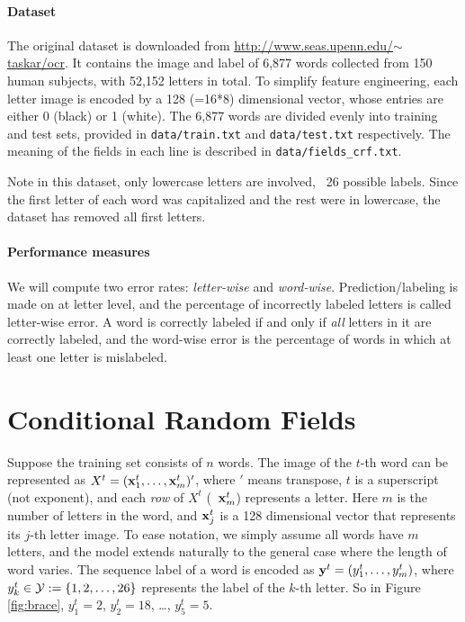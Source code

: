 \documentclass[11pt]{report}
\begin{document}
\paragraph{Dataset}
The original dataset is downloaded from \href{http://www.seas.upenn.edu/~taskar/ocr/}{http://www.seas.upenn.edu/$\sim$taskar/ocr}.
It contains the image and label of 6,877 words collected from 150 human subjects,
with 52,152 letters in total.
To simplify feature engineering, each letter image is encoded by a 128 (=16*8) dimensional vector,
whose entries are either 0 (black) or 1 (white).
The 6,877 words are divided evenly into training and test sets,
provided in \verb#data/train.txt# and \verb#data/test.txt# respectively.
The meaning of the fields in each line is described in \verb#data/fields_crf.txt#.


Note in this dataset, only lowercase letters are involved, \ie\ 26 possible labels.
Since the first letter of each word was capitalized and the rest were in lowercase,
the dataset has removed all first letters.


\paragraph{Performance measures}
%
We will compute two error rates: \emph{letter-wise} and \emph{word-wise}.
Prediction/labeling is made on at letter level,
and the percentage of incorrectly labeled letters is called letter-wise error.
A word is correctly labeled if and only if \emph{all} letters in it are correctly labeled,
and the word-wise error is the percentage of words in which at least one letter is mislabeled.


\section{Conditional Random Fields}

Suppose the training set consists of $n$ words.
The image of the $t$-th word can be represented as
$X^t = (\mathbf{\boldsymbol{x}}^t_1, \ldots, \mathbf{\boldsymbol{x}}^t_m)'$,
where $'$ means transpose,
$t$ is a superscript (not exponent),
and each \emph{row} of $X^t$ (\eg\ $\mathbf{\boldsymbol{x}}^t_m$) represents a letter.
Here $m$ is the number of letters in the word,
and $\mathbf{\boldsymbol{x}}^t_j$ is a 128 dimensional vector that represents its $j$-th letter image.
To ease notation, we simply assume all words have $m$ letters,
and the model extends naturally to the general case where the length of word varies.
The sequence label of a word is encoded as
$\mathbf{\boldsymbol{y}}^t = (y^t_1, \ldots, y^t_m)$,
where $y^t_k \in \mathcal{Y} := \{1, 2, \ldots, 26\}$ represents the label of the $k$-th letter.
So in Figure \ref{fig:brace}, $y^t_1 = 2$, $y^t_2 = 18$, \ldots, $y^t_5 = 5$.
\end{document}
